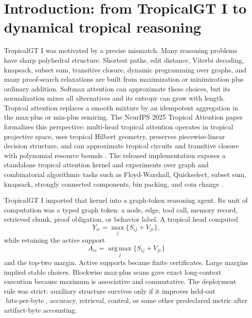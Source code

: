 \documentclass[11pt]{article}
\newcommand{\argmax}{\operatorname*{arg\,max}}
\newcommand{\bpb}{\operatorname{bits\mbox{-}per\mbox{-}byte}}
\begin{document}
\tableofcontents
\newpage

\section{Introduction: from TropicalGT I to dynamical tropical reasoning}

TropicalGT I was motivated by a precise mismatch.  Many reasoning problems have sharp polyhedral structure.  Shortest paths, edit distance, Viterbi decoding, knapsack, subset sum, transitive closure, dynamic programming over graphs, and many proof-search relaxations are built from maximization or minimization plus ordinary addition.  Softmax attention can approximate these choices, but its normalization mixes all alternatives and its entropy can grow with length.  Tropical attention replaces a smooth mixture by an idempotent aggregation in the max-plus or min-plus semiring.  The NeurIPS 2025 Tropical Attention paper formalizes this perspective: multi-head tropical attention operates in tropical projective space, uses tropical Hilbert geometry, preserves piecewise-linear decision structure, and can approximate tropical circuits and transitive closure with polynomial resource bounds \cite{hashemi2025tropical,hashemi2025openreview}.  The released implementation exposes a standalone tropical attention kernel and experiments over graph and combinatorial algorithmic tasks such as Floyd-Warshall, Quickselect, subset sum, knapsack, strongly connected components, bin packing, and coin change \cite{hashemi2025code}.

TropicalGT I imported that kernel into a graph-token reasoning agent.  Its unit of computation was a typed graph token: a node, edge, tool call, memory record, retrieved chunk, proof obligation, or behavior label.  A tropical head computed
\begin{equation}
Y_{ic}=\max_j\{S_{ij}+V_{jc}\},
\end{equation}
while retaining the active support
\begin{equation}
A_{ic}=\argmax_j\{S_{ij}+V_{jc}\}
\end{equation}
and the top-two margin.  Active supports became finite certificates.  Large margins implied stable choices.  Blockwise max-plus scans gave exact long-context execution because maximum is associative and commutative.  The deployment rule was strict: auxiliary structure survives only if it improves held-out \(\bpb\), accuracy, retrieval, control, or some other predeclared metric after artifact-byte accounting.
\end{document}
